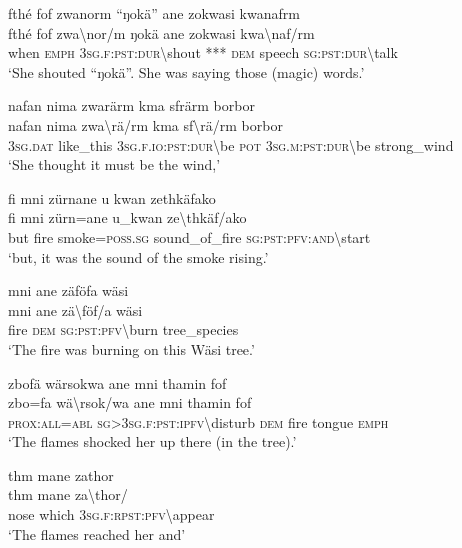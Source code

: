 \ea\label{ex:8:a1835}
fthé fof zwanorm ``ŋokä'' ane zokwasi kwanafrm\\
\gll fthé	fof	zwa{\textbackslash}nor/m	ŋokä	ane	zokwasi	kwa{\textbackslash}naf/rm\\
     when	\textsc{emph}	3\textsc{sg}.\textsc{f}:\textsc{pst}:\textsc{dur}{\textbackslash}shout	***	\textsc{dem}	speech	\textsc{sg}:\textsc{pst}:\textsc{dur}{\textbackslash}talk\\
\glt `She shouted ``ŋokä''. She was saying those (magic) words.'
\z

\ea\label{ex:8:a1836}
nafan nima zwarärm kma sfrärm borbor\\
\gll nafan	nima	zwa{\textbackslash}rä/rm	kma	sf{\textbackslash}rä/rm	borbor\\
     3\textsc{sg}.\textsc{dat}	like\_this	3\textsc{sg}.\textsc{f}.\textsc{io}:\textsc{pst}:\textsc{dur}{\textbackslash}be	\textsc{pot}	3\textsc{sg}.\textsc{m}:\textsc{pst}:\textsc{dur}{\textbackslash}be	strong\_wind\\
\glt `She thought it must be the wind,'
\z

\ea\label{ex:8:a1837}
fi mni zürnane u kwan zethkäfako\\
\gll fi	mni	zürn=ane	u\_kwan	ze{\textbackslash}thkäf/ako\\
     but	fire	smoke=\textsc{poss}.\textsc{sg}	sound\_of\_fire	\textsc{sg}:\textsc{pst}:\textsc{pfv}:\textsc{and}{\textbackslash}start\\
\glt `but, it was the sound of the smoke rising.'
\z

\ea\label{ex:8:a1839}
mni ane zäföfa wäsi\\
\gll mni	ane	zä{\textbackslash}föf/a	wäsi\\
     fire	\textsc{dem}	\textsc{sg}:\textsc{pst}:\textsc{pfv}{\textbackslash}burn	tree\_species\\
\glt `The fire was burning on this Wäsi tree.'
\z

\ea\label{ex:8:a1841}
zbofä wärsokwa ane mni thamin fof\\
\gll zbo=fa	wä{\textbackslash}rsok/wa	ane	mni	thamin	fof\\
     \textsc{prox}:\textsc{all}=\textsc{abl}	\textsc{sg}>3\textsc{sg}.\textsc{f}:\textsc{pst}:\textsc{ipfv}{\textbackslash}disturb	\textsc{dem}	fire	tongue	\textsc{emph}\\
\glt `The flames shocked her up there (in the tree).'
\z

\ea\label{ex:8:a1843}
thm mane zathor\\
\gll thm	mane	za{\textbackslash}thor/\\
     nose	which	3\textsc{sg}.\textsc{f}:\textsc{rpst}:\textsc{pfv}{\textbackslash}appear\\
\glt `The flames reached her and'
\z

